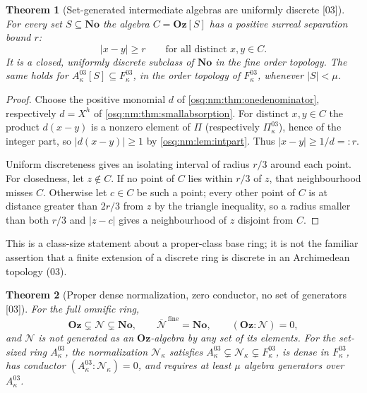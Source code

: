 \documentclass[11pt,letterpaper]{article}
\numberwithin{equation}{section}
\newtheorem{theorem}{Theorem}[section]
\theoremstyle{definition}
\theoremstyle{remark}
\theoremstyle{plain}
\newcommand{\No}{\mathbf{No}}
\newcommand{\Oz}{\mathbf{Oz}}
\newcommand{\NN}{\mathcal N}         %
\newcommand{\src}[1]{\textup{\textsf{[#1]}}}
\begin{document}
\begin{theorem}[Set-generated intermediate algebras are uniformly discrete \src{03}]\label{osq:nm:thm:discrete}
For every set $S\subseteq\No$ the algebra $C=\Oz[S]$ has a positive surreal separation
bound $r$:
\[
 |x-y|\ge r\qquad\text{for all distinct }x,y\in C .
\]
It is a closed, uniformly discrete subclass of $\No$ in the fine order topology. The same
holds for $A^{03}_\kappa[S]\subseteq F^{03}_\kappa$, in the order topology of
$F^{03}_\kappa$, whenever $|S|<\mu$.
\end{theorem}

\begin{proof}
Choose the positive monomial $d$ of \cref{osq:nm:thm:onedenominator}, respectively
$d=X^h$ of \cref{osq:nm:thm:smallabsorption}. For distinct $x,y\in C$ the product
$d(x-y)$ is a nonzero element of $\Pi$ (respectively $\Pi^{03}_\kappa$), hence of the
integer part, so $|d(x-y)|\ge1$ by \cref{osq:nm:lem:intpart}. Thus $|x-y|\ge1/d=:r$.

Uniform discreteness gives an isolating interval of radius $r/3$ around each point. For
closedness, let $z\notin C$. If no point of $C$ lies within $r/3$ of $z$, that
neighbourhood misses $C$. Otherwise let $c\in C$ be such a point; every other point of $C$
is at distance greater than $2r/3$ from $z$ by the triangle inequality, so a radius
smaller than both $r/3$ and $|z-c|$ gives a neighbourhood of $z$ disjoint from $C$.
\end{proof}

This is a class-size statement about a proper-class base ring; it is not the familiar
assertion that a finite extension of a discrete ring is discrete in an Archimedean
topology (03).

\begin{theorem}[Proper dense normalization, zero conductor, no set of generators \src{03}]\label{osq:nm:thm:normalization}
For the full omnific ring,
\begin{equation}\label{osq:nm:eq:normalization}
 \Oz\subsetneq\NN\subsetneq\No,\qquad \overline{\NN}^{\,\mathrm{fine}}=\No,\qquad
 (\Oz:\NN)=0,
\end{equation}
and $\NN$ is not generated as an $\Oz$-algebra by any set of its elements. For the
set-sized ring $A^{03}_\kappa$, the normalization $\NN_\kappa$ satisfies
$A^{03}_\kappa\subsetneq\NN_\kappa\subsetneq F^{03}_\kappa$, is dense in $F^{03}_\kappa$,
has conductor $(A^{03}_\kappa:\NN_\kappa)=0$, and requires at least $\mu$ algebra
generators over $A^{03}_\kappa$.
\end{theorem}
\end{document}
